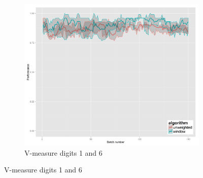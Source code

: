 \begin{figure}[H]
\begin{subfigure}{.3\textwidth}
  \centering
  \includegraphics[width=\linewidth]{pendigits_2_alg/uci_pendigits_16_ci_one_size_vmeasure.png}
  \caption{V-measure digits 1 and 6}
\end{subfigure}


\end{figure}
